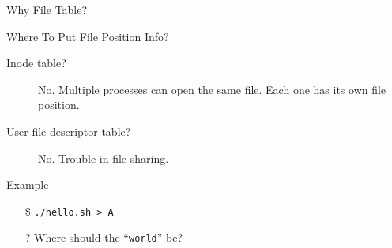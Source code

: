 \begin{frame}{Why File Table?}
  \begin{block}{Where To Put File Position Info?}
    \begin{description}
    \item[Inode table?] No. Multiple processes can open the same file. Each one has its
      own file position.
    \item[User file descriptor table?] No. Trouble in file sharing.
    \end{description}
  \end{block}
  \begin{block}{Example}
    \begin{minipage}{.22\textwidth}
      \begin{center}
      \end{center}
    \end{minipage}\qquad
    \begin{minipage}{.7\textwidth}
      \begin{itemize}
        \item[\$] \texttt{./hello.sh > A}
        \item[?] Where should the ``\texttt{world}'' be?
      \end{itemize}
    \end{minipage}
  \end{block}
\end{frame}

